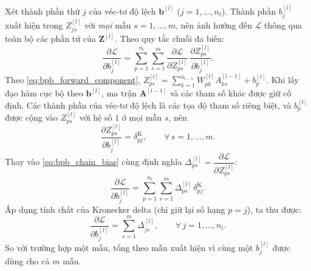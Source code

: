 Xét thành phần thứ $j$ của véc-tơ độ lệch $\mathbf{b}^{[l]}$ ($j = 1,\dots,n_l$). Thành phần $b_j^{[l]}$ xuất hiện trong $Z_{js}^{[l]}$ với \emph{mọi} mẫu $s = 1,\dots,m$, nên ảnh hưởng đến $\mathcal{L}$ thông qua toàn bộ các phần tử của $\mathbf{Z}^{[l]}$. Theo quy tắc chuỗi đa biến:
\begin{equation}
\frac{\partial\mathcal{L}}{\partial b_j^{[l]}} = \sum_{p=1}^{n_l}\sum_{s=1}^{m} \frac{\partial\mathcal{L}}{\partial Z_{ps}^{[l]}}\,\frac{\partial Z_{ps}^{[l]}}{\partial b_j^{[l]}}.
\label{eq:bpb_chain_bias}
\end{equation}
Theo \eqref{eq:bpb_forward_component}, $Z_{ps}^{[l]} = \sum_{k=1}^{n_{l-1}} W_{pk}^{[l]}A_{ks}^{[l-1]} + b_p^{[l]}$. Khi lấy đạo hàm cục bộ theo $\mathbf{b}^{[l]}$, ma trận $\mathbf{A}^{[l-1]}$ và các tham số khác được giữ cố định. Các thành phần của véc-tơ độ lệch là các tọa độ tham số riêng biệt, và $b_p^{[l]}$ được cộng vào $Z_{ps}^{[l]}$ với hệ số $1$ ở mọi mẫu $s$, nên
\begin{equation}
\frac{\partial Z_{ps}^{[l]}}{\partial b_j^{[l]}} = \delta^{\mathrm{K}}_{pj}, \qquad \forall\, s = 1,\dots,m.
\end{equation}
Thay vào \eqref{eq:bpb_chain_bias} cùng định nghĩa $\Delta_{ps}^{[l]} = \dfrac{\partial\mathcal{L}}{\partial Z_{ps}^{[l]}}$:
\begin{equation}
\frac{\partial\mathcal{L}}{\partial b_j^{[l]}} = \sum_{p=1}^{n_l}\sum_{s=1}^{m} \Delta_{ps}^{[l]}\,\delta^{\mathrm{K}}_{pj}.
\end{equation}
Áp dụng tính chất của Kronecker delta (chỉ giữ lại số hạng $p = j$), ta thu được:
\begin{equation}
\frac{\partial\mathcal{L}}{\partial b_j^{[l]}} = \sum_{s=1}^{m}\Delta_{js}^{[l]}, \qquad \forall\, j = 1,\dots,n_l.
\label{eq:bpb_bias_component}
\end{equation}
So với trường hợp một mẫu, tổng theo mẫu xuất hiện vì cùng một $b_j^{[l]}$ được dùng cho cả $m$ mẫu.
 
